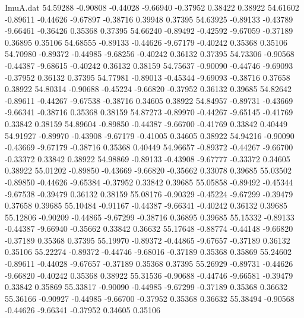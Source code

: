 \begin{filecontents}{ImuA.dat}
  54.59288   -0.90808   -0.44028   -9.66940   -0.37952    0.38422    0.38922
  54.61602   -0.89611   -0.44626   -9.67897   -0.38716    0.39948    0.37395
  54.63925   -0.89133   -0.43789   -9.66461   -0.36426    0.35368    0.37395
  54.66240   -0.89492   -0.42592   -9.67059   -0.37189    0.36895    0.35106
  54.68555   -0.89133   -0.44626   -9.67179   -0.40242    0.35368    0.35106
  54.70980   -0.89372   -0.44985   -9.68256   -0.40242    0.36132    0.37395
  54.73306   -0.90568   -0.44387   -9.68615   -0.40242    0.36132    0.38159
  54.75637   -0.90090   -0.44746   -9.69093   -0.37952    0.36132    0.37395
  54.77981   -0.89013   -0.45344   -9.69093   -0.38716    0.37658    0.38922
  54.80314   -0.90688   -0.45224   -9.66820   -0.37952    0.36132    0.39685
  54.82642   -0.89611   -0.44267   -9.67538   -0.38716    0.34605    0.38922
  54.84957   -0.89731   -0.43669   -9.66341   -0.38716    0.35368    0.38159
  54.87273   -0.89970   -0.44267   -9.65145   -0.41769    0.33842    0.38159
  54.89604   -0.89850   -0.44387   -9.66700   -0.41769    0.33842    0.40449
  54.91927   -0.89970   -0.43908   -9.67179   -0.41005    0.34605    0.38922
  54.94216   -0.90090   -0.43669   -9.67179   -0.38716    0.35368    0.40449
  54.96657   -0.89372   -0.44267   -9.66700   -0.33372    0.33842    0.38922
  54.98869   -0.89133   -0.43908   -9.67777   -0.33372    0.34605    0.38922
  55.01202   -0.89850   -0.43669   -9.66820   -0.35662    0.33078    0.39685
  55.03502   -0.89850   -0.44626   -9.65384   -0.37952    0.33842    0.39685
  55.05858   -0.89492   -0.45344   -9.67538   -0.39479    0.36132    0.38159
  55.08176   -0.90329   -0.45224   -9.67299   -0.39479    0.37658    0.39685
  55.10484   -0.91167   -0.44387   -9.66341   -0.40242    0.36132    0.39685
  55.12806   -0.90209   -0.44865   -9.67299   -0.38716    0.36895    0.39685
  55.15332   -0.89133   -0.44387   -9.66940   -0.35662    0.33842    0.36632
  55.17648   -0.88774   -0.44148   -9.66820   -0.37189    0.35368    0.37395
  55.19970   -0.89372   -0.44865   -9.67657   -0.37189    0.36132    0.35106
  55.22274   -0.89372   -0.44746   -9.68016   -0.37189    0.35368    0.35869
  55.24602   -0.89611   -0.44028   -9.67657   -0.37189    0.35368    0.37395
  55.26929   -0.89731   -0.44626   -9.66820   -0.40242    0.35368    0.38922
  55.31536   -0.90688   -0.44746   -9.66581   -0.39479    0.33842    0.35869
  55.33817   -0.90090   -0.44985   -9.67299   -0.37189    0.35368    0.36632
  55.36166   -0.90927   -0.44985   -9.66700   -0.37952    0.35368    0.36632
  55.38494   -0.90568   -0.44626   -9.66341   -0.37952    0.34605    0.35106

\end{filecontents}
